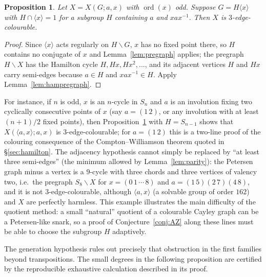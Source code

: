 \documentclass[11pt,a4paper]{article}
\newtheorem{proposition}[theorem]{Proposition}
\theoremstyle{definition}
\theoremstyle{remark}
\newcommand{\ord}{\operatorname{ord}}
\newcommand{\X}[3]{X(#1;#2,#3)}
\begin{document}
\begin{proposition}\label{prop:exact}
Let $X=\X{G}{a}{x}$ with $\ord(x)$ odd.  Suppose $G=H\langle x\rangle$ with $H\cap\langle x\rangle=1$ for a subgroup $H$ containing $a$ and $xax^{-1}$.  Then $X$ is $3$-edge-colourable.
\end{proposition}
\begin{proof}
Since $\langle x\rangle$ acts regularly on $H\backslash G$, $x$ has no fixed point there, so $H$ contains no conjugate of $x$ and Lemma~\ref{lem:pregraph} applies; the pregraph $H\backslash X$ has the Hamilton cycle $H,Hx,Hx^2,\dots$, and its adjacent vertices $H$ and $Hx$ carry semi-edges because $a\in H$ and $xax^{-1}\in H$.  Apply Lemma~\ref{lem:hampregraph}.
\end{proof}

For instance, if $n$ is odd, $x$ is an $n$-cycle in $S_n$ and $a$ is an involution fixing two cyclically consecutive points of $x$ (say $a=(1\,2)$, or any involution with at least $(n+1)/2$ fixed points), then Proposition~\ref{prop:exact} with $H=S_{n-1}$ shows that $\X{\langle a,x\rangle}{a}{x}$ is $3$-edge-colourable; for $a=(1\,2)$ this is a two-line proof of the colouring consequence of the Compton--Williamson theorem quoted in \S\ref{sec:hamilton}.  The adjacency hypothesis cannot simply be replaced by ``at least three semi-edges'' (the minimum allowed by Lemma~\ref{lem:parity}): the Petersen graph minus a vertex is a $9$-cycle with three chords and three vertices of valency two, i.e.\ the pregraph $S_8\backslash X$ for $x=(0\,1\,\cdots\,8)$ and $a=(1\,5)(2\,7)(4\,8)$, and it is not $3$-edge-colourable, although $\langle a,x\rangle$ (a solvable group of order $162$) and $X$ are perfectly harmless.  This example illustrates the main difficulty of the quotient method: a small ``natural'' quotient of a colourable Cayley graph can be a Petersen-like snark, so a proof of Conjecture~\ref{conj:AZ} along these lines must be able to choose the subgroup $H$ adaptively.

The generation hypothesis rules out precisely that obstruction in the first families beyond transpositions.  The small degrees in the following proposition are certified by the reproducible exhaustive calculation described in its proof.
\end{document}
